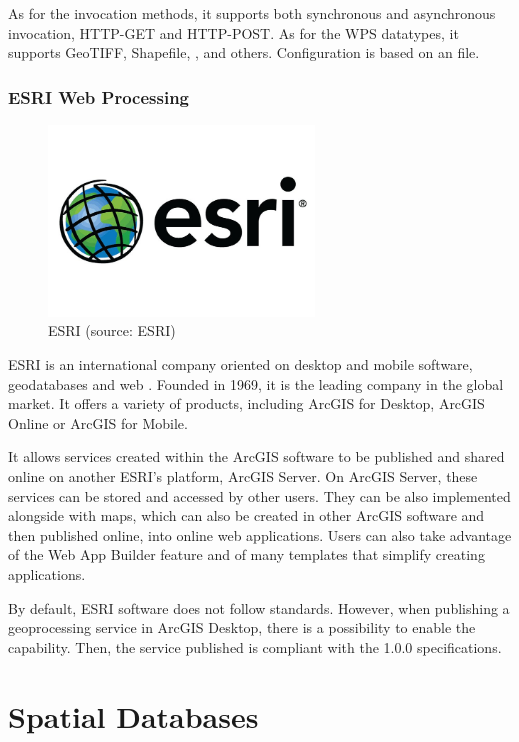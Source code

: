 As for the  invocation methods, it supports both synchronous and
asynchronous invocation, HTTP-GET and HTTP-POST. As for the WPS
datatypes, it supports GeoTIFF, Shapefile, ,  and
others. \cite{north} Configuration is based on an  file.
  

\subsubsection{ESRI Web Processing}

\begin{figure}[H] \centering
      \includegraphics[width=200pt]{./pictures/esri.png}
      \caption[ESRI logo]{ESRI (source: ESRI)}
      \label{fig:ESRI}
  \end{figure}

ESRI is an international company oriented on desktop and mobile 
software, geodatabases and web . Founded in 1969, it is the leading
company in the global  market. It offers a variety of  products,
including ArcGIS for Desktop, ArcGIS Online or ArcGIS for Mobile.

It allows services created within the ArcGIS software to be published
and shared online on another ESRI's platform, ArcGIS Server. \cite{esripublish} On ArcGIS
Server, these services can be stored and accessed by other users. They
can be also implemented alongside with maps, which can also be created
in other ArcGIS software and then published online, into online web
applications. Users can also take advantage of the Web App Builder
feature and of many templates that simplify creating applications.

By default, ESRI software does not follow  standards. However, when
publishing a geoprocessing service in ArcGIS Desktop, there is a
possibility to enable the  capability. Then, the service published
is compliant with the   1.0.0 specifications.\cite{arcgiswps}

\section{Spatial Databases}

